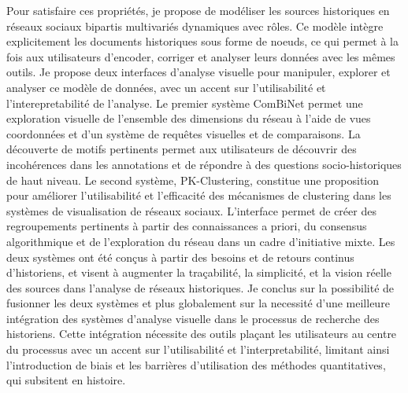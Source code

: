 {    Pour satisfaire ces propriétés, je propose de modéliser les sources historiques en réseaux sociaux bipartis multivariés dynamiques avec rôles.
    Ce modèle intègre explicitement les documents historiques sous forme de noeuds, ce qui permet à la fois aux utilisateurs d'encoder, corriger et analyser leurs données avec les mêmes outils.
    Je propose deux interfaces d'analyse visuelle pour manipuler, explorer et analyser ce modèle de données, avec un accent sur l'utilisabilité et l'interepretabilité de l'analyse.
    Le premier système ComBiNet permet une exploration visuelle de l'ensemble des dimensions du réseau à l'aide de vues coordonnées et d'un système de requêtes visuelles et de comparaisons.
    La découverte de motifs pertinents permet aux utilisateurs de découvrir des incohérences dans les annotations et de répondre à des questions socio-historiques de haut niveau.
    Le second système, PK-Clustering, constitue une proposition pour améliorer l'utilisabilité et l'efficacité des mécanismes de clustering dans les systèmes de visualisation de réseaux sociaux.
    L'interface permet de créer des regroupements pertinents à partir des connaissances a priori, du consensus algorithmique et de l'exploration du réseau dans un cadre d'initiative mixte.
    Les deux systèmes ont été conçus à partir des besoins et de retours continus d'historiens, et visent à augmenter la traçabilité, la simplicité, et la vision réelle des sources dans l'analyse de réseaux historiques.
    Je conclus sur la possibilité de fusionner les deux systèmes et plus globalement sur la necessité d'une meilleure intégration des systèmes d'analyse visuelle dans le processus de recherche des historiens.
    Cette intégration nécessite des outils plaçant les utilisateurs au centre du processus avec un accent sur l'utilisabilité et l'interpretabilité, limitant ainsi l'introduction de biais et les barrières d'utilisation des méthodes quantitatives, qui subsitent en histoire.
}
